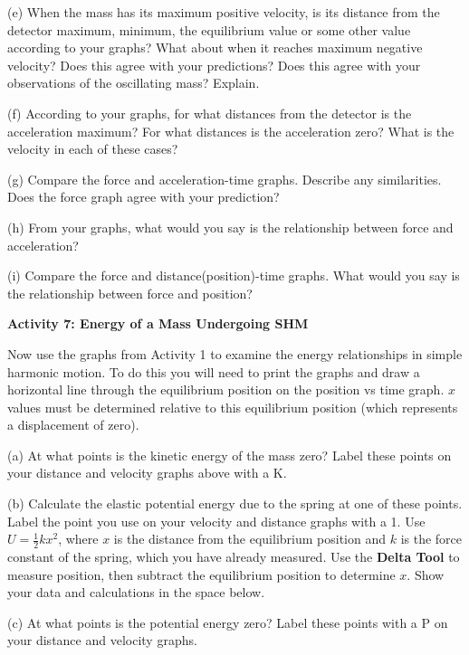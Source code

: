 (e) When the mass has its maximum positive velocity, is its distance from the
detector maximum, minimum, the equilibrium value or some other value according
to your graphs? What about when it reaches maximum negative velocity? Does this
agree with your predictions? Does this agree with your observations of the 
oscillating mass? Explain. 
\answerspace{10mm}

\pagebreak[2]
(f) According to your graphs, for what distances from the detector is the 
acceleration maximum? For what distances is the acceleration zero? What is the 
velocity in each of these cases?
\vspace{20mm}

(g) Compare the force and acceleration-time graphs. Describe any similarities.
Does the force graph agree with your prediction?
\vspace{20mm}

(h) From your graphs, what would you say is the relationship between force and
acceleration? 
\vspace{20mm}

(i) Compare the force and distance(position)-time graphs. What would you say
is the relationship between force and position? 
\vspace{20mm}

\textbf{Activity 7: Energy of a Mass Undergoing SHM }

Now use the graphs from Activity 1 to examine the energy relationships
in simple harmonic motion. To do this you will need to print the graphs and draw a horizontal line through the equilibrium position on the position vs time graph.  $x$ values must be determined relative to this equilibrium position (which represents a displacement of zero).

(a) At what points is the kinetic energy of the mass zero? Label these points
on your distance and velocity graphs above with a K.

(b) Calculate the elastic potential energy due to the spring at one of these
points. Label the point you use on your velocity and distance graphs with a
1. Use $U = \frac{1}{2}kx^{2}$, where  $x$ is the distance from the equilibrium 
position and $k$ is the force constant of the spring, which you have already 
measured. Use the \textbf{Delta Tool} to measure position, then subtract the 
equilibrium position to determine $x$. Show your data and calculations 
in the space below. 
\vspace{25mm}

(c) At what points is the potential energy zero? Label these points with a P
on your distance and velocity graphs.


